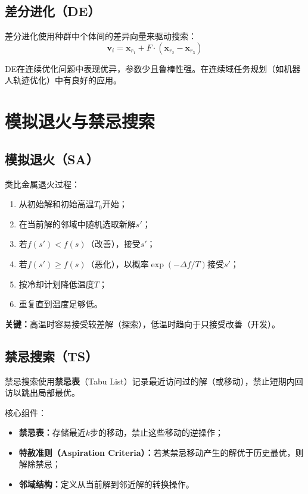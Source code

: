 \subsection{差分进化（DE）\grad}

差分进化使用种群中个体间的差异向量来驱动搜索：
$$\mathbf{v}_i = \mathbf{x}_{r_1} + F \cdot (\mathbf{x}_{r_2} - \mathbf{x}_{r_3})$$

DE在连续优化问题中表现优异，参数少且鲁棒性强。在连续域任务规划（如机器人轨迹优化）中有良好的应用。

\section{模拟退火与禁忌搜索 \ug}

\subsection{模拟退火（SA）}

\begin{algbox}[title={\textbf{模拟退火核心思想}}]
类比金属退火过程：
\begin{enumerate}
  \item 从初始解和初始高温$T_0$开始；
  \item 在当前解的邻域中随机选取新解$s'$；
  \item 若$f(s') < f(s)$（改善），接受$s'$；
  \item 若$f(s') \geq f(s)$（恶化），以概率$\exp(-\Delta f / T)$接受$s'$；
  \item 按冷却计划降低温度$T$；
  \item 重复直到温度足够低。
\end{enumerate}
\textbf{关键：}高温时容易接受较差解（探索），低温时趋向于只接受改善（开发）。
\end{algbox}

\subsection{禁忌搜索（TS）\grad}

禁忌搜索使用\textbf{禁忌表}（Tabu List）记录最近访问过的解（或移动），禁止短期内回访以跳出局部最优。

核心组件：
\begin{itemize}
  \item \textbf{禁忌表：}存储最近$k$步的移动，禁止这些移动的逆操作；
  \item \textbf{特赦准则（Aspiration Criteria）：}若某禁忌移动产生的解优于历史最优，则解除禁忌；
  \item \textbf{邻域结构：}定义从当前解到邻近解的转换操作。
\end{itemize}

